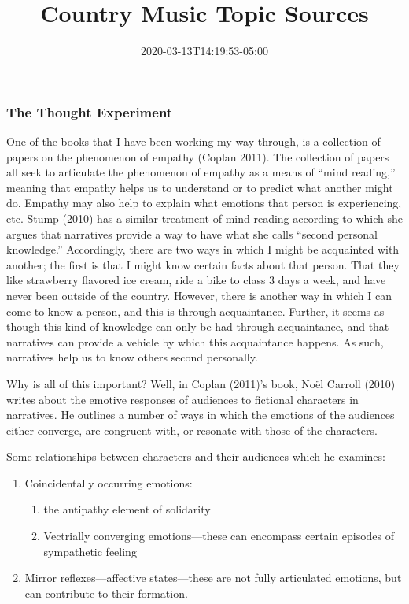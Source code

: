 \documentclass[]{article}
\title{Country Music Topic Sources}
\author{}
\date{\vspace{-2.5em}2020-03-13T14:19:53-05:00}
\providecommand{\tightlist}{%
  \setlength{\itemsep}{0pt}\setlength{\parskip}{0pt}}
\begin{document}
\maketitle

\hypertarget{the-thought-experiment}{%
\subsubsection{The Thought Experiment}\label{the-thought-experiment}}

One of the books that I have been working my way through, is a
collection of papers on the phenomenon of empathy (Coplan 2011). The
collection of papers all seek to articulate the phenomenon of empathy as
a means of ``mind reading,'' meaning that empathy helps us to understand
or to predict what another might do. Empathy may also help to explain
what emotions that person is experiencing, etc. Stump (2010) has a
similar treatment of mind reading according to which she argues that
narratives provide a way to have what she calls ``second personal
knowledge.'' Accordingly, there are two ways in which I might be
acquainted with another; the first is that I might know certain facts
about that person. That they like strawberry flavored ice cream, ride a
bike to class 3 days a week, and have never been outside of the country.
However, there is another way in which I can come to know a person, and
this is through acquaintance. Further, it seems as though this kind of
knowledge can only be had through acquaintance, and that narratives can
provide a vehicle by which this acquaintance happens. As such,
narratives help us to know others second personally.

Why is all of this important? Well, in Coplan (2011)'s book, Noël
Carroll (2010) writes about the emotive responses of audiences to
fictional characters in narratives. He outlines a number of ways in
which the emotions of the audiences either converge, are congruent with,
or resonate with those of the characters.

Some relationships between characters and their audiences which he
examines:

\begin{enumerate}
\def\labelenumi{\arabic{enumi}.}
\tightlist
\item
  Coincidentally occurring emotions:

  \begin{enumerate}
  \def\labelenumii{\arabic{enumii}.}
  \tightlist
  \item
    the antipathy element of solidarity
  \item
    Vectrially converging emotions---these can encompass certain
    episodes of sympathetic feeling
  \end{enumerate}
\item
  Mirror reflexes---affective states---these are not fully articulated
  emotions, but can contribute to their formation.
\end{enumerate}
\end{document}
